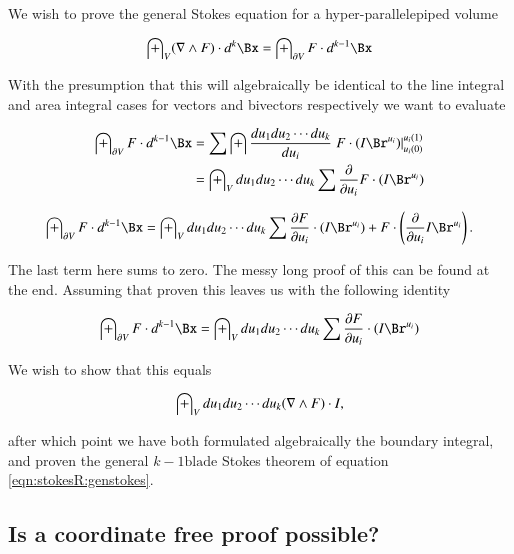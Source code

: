 We wish to prove the general Stokes equation for a hyper-parallelepiped volume

\begin{equation}\label{eqn:stokesR:genstokes}
\int_V (\grad \wedge F) \cdot d^{k}\Bx = \int_{\partial V} F \cdot d^{k-1}\Bx 
\end{equation}

With the presumption that this will algebraically be identical to the line integral and area integral cases for vectors and bivectors respectively
we want to evaluate

\begin{align*}
\int_{\partial V} F \cdot d^{k-1}\Bx 
&= \sum \int \frac{du_1 du_2 \cdots du_k}{du_i} \left.{F \cdot (I \Br^{u_i})}\right\vert_{u_i(0)}^{u_i(1)} \\
&= \int_V du_1 du_2 \cdots du_k \sum \PD{u_i}{} F \cdot (I \Br^{u_i}) \\
\end{align*}

\begin{equation}\label{eqn:stokesR:toprove}
\int_{\partial V} F \cdot d^{k-1}\Bx 
= \int_V du_1 du_2 \cdots du_k \sum \PD{u_i}{F} \cdot (I \Br^{u_i}) +F \cdot \left( \PD{u_i}{} I \Br^{u_i} \right).
\end{equation}

The last term here sums to zero.  The messy long proof of this can be found at the end.  Assuming that proven this leaves us with the following identity

\begin{equation}\label{eqn:stokesR:alsoProve}
\int_{\partial V} F \cdot d^{k-1}\Bx 
= \int_V du_1 du_2 \cdots du_k \sum \PD{u_i}{F} \cdot (I \Br^{u_i})
\end{equation}

We wish to show that this equals

\begin{equation*}
\int_V du_1 du_2 \cdots du_k (\nabla \wedge F) \cdot I,
\end{equation*}

after which point we have both formulated algebraically the boundary integral, and proven the general $k-1\text{blade}$ Stokes theorem of equation \ref{eqn:stokesR:genstokes}.

\subsection{Is a coordinate free proof possible? }

